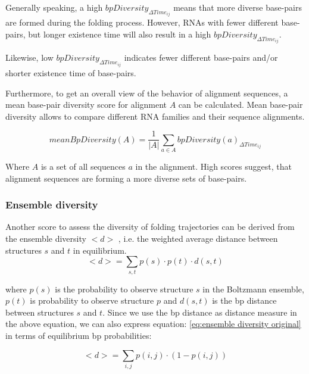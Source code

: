 \documentclass[ twoside,openright,titlepage,numbers=noenddot,headinclude,%
                footinclude=false, cleardoublepage=empty,abstractoff, %
                BCOR=5mm,paper=a4,fontsize=11pt,%
                ngerman,american,%
                ]{scrreprt}
\begin{document}
Generally speaking, a high $bpDiversity_{\Delta Time_{ij}}$ means that more diverse base-pairs are formed during
the folding process. However, RNAs with fewer different base-pairs, but
longer existence time will also result in a high $bpDiversity_{\Delta Time_{ij}}$. 

Likewise, low $bpDiversity_{\Delta Time_{ij}}$ indicates fewer different base-pairs and/or shorter existence
time of base-pairs.

			
Furthermore, to get an overall view of the behavior of alignment sequences, a mean base-pair diversity score for alignment $A$ can be
calculated.  Mean base-pair diversity allows to compare different RNA
families and their sequence alignments.

\begin{equation}
meanBpDiversity(A) = \frac{1}{|A|}\sum\limits_{a \in A} bpDiversity(a)_{\Delta Time_{ij}}
\label{eq:time depended base-pair alignment diversity}
\end{equation}
	
Where $A$  is a set of all sequences $a$ in the alignment. High scores suggest, that alignment sequences are forming a more diverse sets of base-pairs.

							
\FloatBarrier	


\subsubsection{Ensemble diversity}	
		
Another score to assess the diversity of folding trajectories
can be derived from the ensemble diversity $<d>$ \cite{dissRonny}, i.e. the
weighted average distance between structures $s$ and $t$ in equilibrium.
\begin{equation}
<d> = \sum\limits_{s,t} p(s) \cdot p(t) \cdot d(s,t) 
\label{eq:ensemble diversity original}
\end{equation}

where $p(s)$ is the probability to observe structure $s$ in the Boltzmann
ensemble, $p(t)$ is probability to observe structure $p$ and $d(s,t)$ is
the bp distance between structures $s$ and $t$.  Since we use the bp
distance as distance measure in the above equation, we can also express
equation: \ref{eq:ensemble diversity original} in terms of equilibrium bp
probabilities: \cite{EnsembleDistance}

\begin{equation}
<d>=\sum\limits_{i,j} p(i,j)\cdot(1- p(i,j))
\end{equation}
\end{document}
